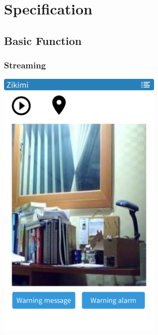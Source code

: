\documentclass[12pt]{article}
\begin{document}

\newpage \section{Specification}


\subsection{Basic Function}

\subsubsection{Streaming}
\begin{center} 
\includegraphics[width=80mm,scale=1.2]{basicstreaming}
\end{center}
\end{document}
